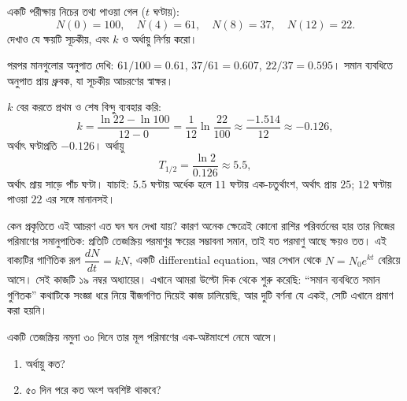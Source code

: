 \documentclass[11pt]{article}
\begin{document}
\begin{center}
\end{center}

\begin{example}
একটি পরীক্ষায় নিচের তথ্য পাওয়া গেল ($t$ ঘণ্টায়):
\[
  N(0) = 100, \quad N(4) = 61, \quad N(8) = 37, \quad N(12) = 22 .
\]
দেখাও যে ক্ষয়টি সূচকীয়, এবং $k$ ও অর্ধায়ু নির্ণয় করো।
\end{example}

\begin{solbox}
পরপর মানগুলোর অনুপাত দেখি: $61/100 = 0.61$, $37/61 = 0.607$,
$22/37 = 0.595$। সমান ব্যবধিতে অনুপাত প্রায় ধ্রুবক, যা সূচকীয় আচরণের স্বাক্ষর।

$k$ বের করতে প্রথম ও শেষ বিন্দু ব্যবহার করি:
\[
  k = \frac{\ln 22 - \ln 100}{12 - 0} = \frac{1}{12} \ln \frac{22}{100}
  \approx \frac{-1.514}{12} \approx -0.126 ,
\]
অর্থাৎ ঘণ্টাপ্রতি $-0.126$। অর্ধায়ু
\[
  T_{1/2} = \frac{\ln 2}{0.126} \approx 5.5 ,
\]
অর্থাৎ প্রায় সাড়ে পাঁচ ঘণ্টা।
যাচাই: $5.5$ ঘণ্টায় অর্ধেক হলে $11$ ঘণ্টায় এক-চতুর্থাংশ, অর্থাৎ প্রায় $25$;
$12$ ঘণ্টায় পাওয়া $22$ এর সঙ্গে মানানসই।
\end{solbox}

\begin{remark}
কেন প্রকৃতিতে এই আচরণ এত ঘন ঘন দেখা যায়? কারণ অনেক ক্ষেত্রেই কোনো রাশির
পরিবর্তনের হার তার নিজের পরিমাণের সমানুপাতিক: প্রতিটি তেজস্ক্রিয় পরমাণুর ক্ষয়ের
সম্ভাবনা সমান, তাই যত পরমাণু আছে ক্ষয়ও তত। এই বাক্যটির গাণিতিক রূপ
$\dfrac{dN}{dt} = kN$, একটি differential equation, আর সেখান থেকে
$N = N_{0}e^{kt}$ বেরিয়ে আসে। সেই কাজটি ১৯ নম্বর অধ্যায়ের। এখানে আমরা
উল্টো দিক থেকে শুরু করেছি: ``সমান ব্যবধিতে সমান গুণিতক'' কথাটিকে সংজ্ঞা ধরে
নিয়ে বীজগণিত দিয়েই কাজ চালিয়েছি, আর দুটি বর্ণনা যে একই, সেটি এখানে
প্রমাণ করা হয়নি।
\end{remark}

 একটি তেজস্ক্রিয় নমুনা ৩০ দিনে তার মূল পরিমাণের এক-অষ্টমাংশে নেমে আসে।
\begin{enumerate}
  \item অর্ধায়ু কত?
  \item ৫০ দিন পরে কত অংশ অবশিষ্ট থাকবে?
\end{enumerate}
\end{document}
